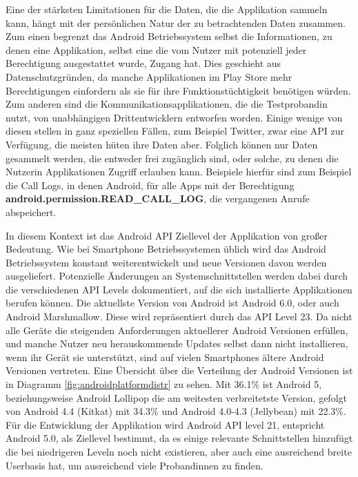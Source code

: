 Eine der stärksten Limitationen für die Daten, die die Applikation sammeln kann, hängt mit der persönlichen Natur der zu betrachtenden Daten zusammen.
Zum einen begrenzt das Android Betriebssystem selbst die Informationen, zu denen eine Applikation, selbst eine die vom Nutzer mit potenziell jeder Berechtigung ausgestattet wurde, Zugang hat.
Dies geschieht aus Datenschutzgründen, da manche Applikationen im Play Store mehr Berechtigungen einfordern als sie für ihre Funktionstüchtigkeit benötigen würden.
Zum anderen sind die Kommunikationsapplikationen, die die Testprobandin nutzt, von unabhängigen Drittentwicklern entworfen worden.
Einige wenige von diesen stellen in ganz speziellen Fällen, zum Beispiel Twitter\cite{twitterapi}, zwar eine API zur Verfügung, die meisten hüten ihre Daten aber.
Folglich können nur Daten gesammelt werden, die entweder frei zugänglich sind, oder solche, zu denen die Nutzerin Applikationen Zugriff erlauben kann.
Beispiele hierfür sind zum Beispiel die Call Logs, in denen Android, für alle Apps mit der Berechtigung \textbf{android.permission.READ\_CALL\_LOG}, die vergangenen Anrufe abspeichert.
\par

In diesem Kontext ist das Android API Ziellevel der Applikation von großer Bedeutung.
Wie bei Smartphone Betriebssystemen üblich wird das Android Betriebssystem konstant weiterentwickelt und neue Versionen davon werden ausgeliefert.
Potenzielle Änderungen an Systemschnittstellen werden dabei durch die verschiedenen API Levels dokumentiert, auf die sich installierte Applikationen berufen können.
Die aktuellste Version von Android ist Android 6.0, oder auch Android Marshmallow.
Diese wird repräsentiert durch das API Level 23.
Da nicht alle Geräte die steigenden Anforderungen aktuellerer Android Versionen erfüllen, 
und manche Nutzer neu herauskommende Updates selbst dann nicht installieren, wenn ihr Gerät sie unterstützt, 
sind auf vielen Smartphones ältere Android Versionen vertreten.
Eine Übersicht über die Verteilung der Android Versionen ist in Diagramm \ref{fig:androidplatformdistr} zu sehen.
Mit 36.1\% ist Android 5, beziehungsweise Android Lollipop die am weitesten verbreitetste Version,
gefolgt von Android 4.4 (Kitkat) mit 34.3\% und Android 4.0-4.3 (Jellybean) mit 22.3\%\cite{androiddistr}.
Für die Entwicklung der Applikation wird Android API level 21, entspricht Android 5.0, als Ziellevel bestimmt, da es einige relevante Schnittstellen hinzufügt die bei niedrigeren Leveln noch nicht existieren, aber auch eine ausreichend breite Userbasis hat, um ausreichend viele Probandinnen zu finden.


